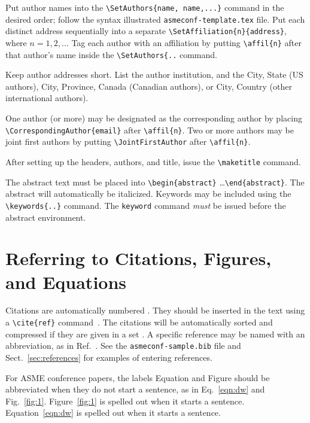 \documentclass[captionpatch,colorlinks,upint,subscriptcorrection,varvw,german]{asmeconf}
\begin{document}
Put author names into the \verb|\SetAuthors{name, name,...}| command in the desired order; follow the syntax illustrated \texttt{asmeconf-template.tex} file. Put each distinct address sequentially into a separate \verb|\SetAffiliation{n}{address}|, where $n = 1,2,\ldots$ Tag each author with an affiliation by putting \verb|\affil{n}| after that author's name inside the \verb|\SetAuthors{..| command. 

Keep author addresses short.  List the author institution, and the City, State (US authors), City, Province, Canada (Canadian authors), or City, Country (other international authors). 

One author (or more) may be designated as the corresponding author by placing \verb|\CorrespondingAuthor{email}|  after \verb|\affil{n}|. Two or more authors may be joint first authors by putting \verb|\JointFirstAuthor| after \verb|\affil{n}|.

After setting up the headers, authors,  and title, issue the \verb|\maketitle| command. 

The abstract text must be placed into \verb|\begin{abstract}| \ldots \verb|\end{abstract}|. The abstract will automatically be italicized. Keywords may be included using the \verb|\keywords{..}| command. The \texttt{keyword} command \textit{must} be issued before the abstract environment. 


\section{Referring to Citations, Figures, and Equations}

Citations are automatically numbered \cite{ning2002}. They should be inserted in the text using a \verb|\cite{ref}| command~\cite{gibson2008,stevens1999}. The citations will be automatically sorted and compressed if they are given in a set \cite{stevens1999,ning2002,gibson2008,wions2005,smith2002,watson1982}. 
A specific reference may be named with an abbreviation, as in Ref.~\cite{watson1982}.
See the \texttt{asmeconf-sample.bib} file and Sect.~\ref{sec:references} for examples of entering references.

For ASME conference papers, the labels Equation and Figure should be abbreviated when they do not start a sentence, as in  Eq.~\eqref{eqn:dw} and Fig.~\ref{fig:1}. Figure~\ref{fig:1} is spelled out when it starts a sentence. Equation~\eqref{eqn:dw} is spelled out when it starts a sentence. 
\end{document}
